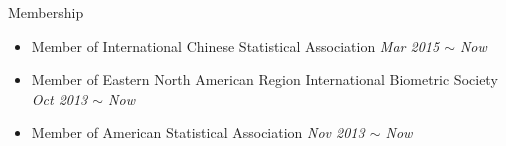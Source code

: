 \documentclass{resume} %
\begin{document}



\begin{rSection}{Membership}
\begin{itemize}[noitemsep,topsep=0pt]
\item Member of International Chinese Statistical Association
        \hfill {\em Mar 2015 $\sim$ Now} 
\item Member of Eastern North American Region International Biometric Society
        \hfill {\em Oct 2013 $\sim$ Now} 
\item Member of American Statistical Association
        \hfill {\em Nov 2013 $\sim$ Now} 
\end{itemize}
\end{rSection}
\end{document}
